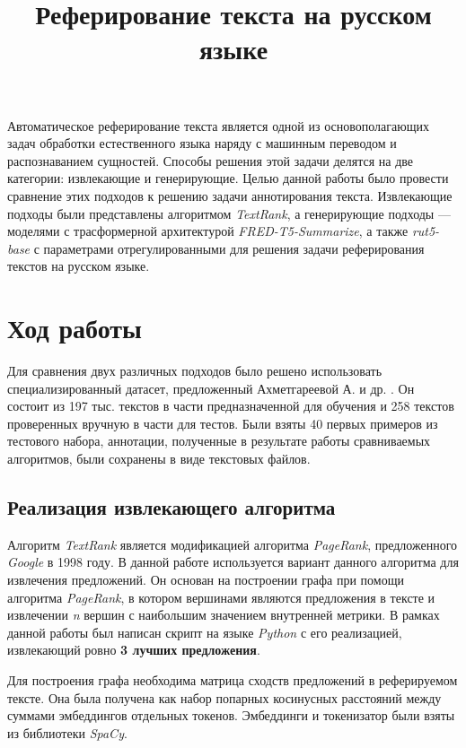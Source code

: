 \documentclass[12pt, a4paper]{article}
\title{Реферирование текста на русском языке}
\begin{document}
	\maketitle

	\tableofcontents
	
	\begin{introduction}
        Автоматическое реферирование текста является одной из основополагающих задач обработки естественного языка наряду с машинным переводом и распознаванием сущностей. Способы решения этой задачи делятся на две категории: извлекающие и генерирующие. Целью данной работы было провести сравнение этих подходов к решению задачи аннотирования текста. Извлекающие подходы были представлены алгоритмом \textit{TextRank}, а генерирующие подходы --- моделями с трасформерной архитектурой \textit{FRED-T5-Summarize}, а также \textit{rut5-base} с параметрами отрегулированными для решения задачи реферирования текстов на русском языке.  
	\end{introduction}
	
	\section{Ход работы}

    Для сравнения двух различных подходов было решено использовать специализированный датасет, предложенный Ахметгареевой А. и др. \cite{dataset}. Он состоит из 197 тыс. текстов в части предназначенной для обучения и 258 текстов проверенных вручную в части для тестов. Были взяты 40 первых примеров из тестового набора, аннотации, полученные в результате работы сравниваемых алгоритмов, были сохранены в виде текстовых файлов.

    \subsection{Реализация извлекающего алгоритма}
    Алгоритм \textit{TextRank} является модификацией алгоритма \textit{PageRank}, предложенного \textit{Google} в 1998 году. В данной работе используется вариант данного алгоритма для извлечения предложений. Он основан на построении графа при помощи алгоритма \textit{PageRank}, в котором вершинами являются предложения в тексте и извлечении \textit{n} вершин с наибольшим значением внутренней метрики. В рамках данной работы был написан скрипт на языке \textit{Python} с его реализацией, извлекающий ровно \textbf{3 лучших предложения}. 

    Для построения графа необходима матрица сходств предложений в реферируемом тексте. Она была получена как набор попарных косинусных расстояний между суммами эмбеддингов отдельных токенов. Эмбеддинги и токенизатор были взяты из библиотеки \textit{SpaCy}.
\end{document}
